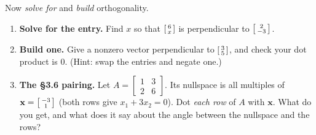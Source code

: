 \documentclass[10pt]{article}
\newcommand{\xx}{\mathbf{x}}
\begin{document}
\begin{tcolorbox}[colback=white, colframe=black!40, title=\textbf{Tier A --- Approaching Proficiency},
    fonttitle=\bfseries, arc=1.5mm, left=3mm, right=3mm, top=2mm, bottom=2mm, breakable]
Now \emph{solve for} and \emph{build} orthogonality.
\begin{enumerate}[leftmargin=1.7em, itemsep=9pt]
  \item \textbf{Solve for the entry.} Find $x$ so that $\begin{bsmallmatrix} 6\\x \end{bsmallmatrix}$
        is perpendicular to $\begin{bsmallmatrix} 2\\-3 \end{bsmallmatrix}$. 
  \item \textbf{Build one.} Give a nonzero vector perpendicular to
        $\begin{bsmallmatrix} 3\\5 \end{bsmallmatrix}$, and check your dot product is $0$.
        (Hint: swap the entries and negate one.) 
  \item \textbf{The §3.6 pairing.} Let $A=\begin{bmatrix} 1 & 3 \\ 2 & 6 \end{bmatrix}$. Its
        nullspace is all multiples of $\xx=\begin{bsmallmatrix} -3\\1 \end{bsmallmatrix}$ (both rows
        give $x_1+3x_2=0$). Dot \emph{each row} of $A$ with $\xx$. What do you get, and what does it
        say about the angle between the nullspace and the rows? 
\end{enumerate}
\end{tcolorbox}
\end{document}

